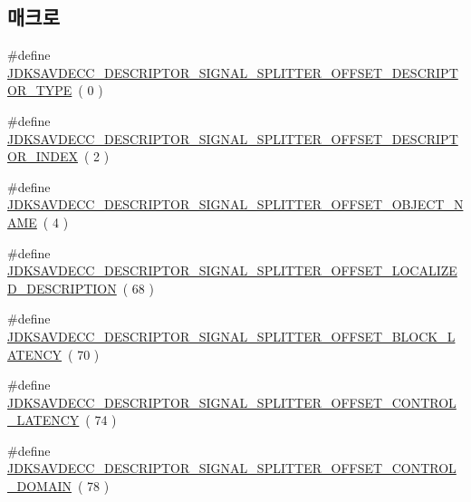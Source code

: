 \subsection*{매크로}
\begin{DoxyCompactItemize}
\item 
\#define \hyperlink{group__descriptor__signal__splitter_gaa30141f887824db3fb3f23ed7300f216}{J\+D\+K\+S\+A\+V\+D\+E\+C\+C\+\_\+\+D\+E\+S\+C\+R\+I\+P\+T\+O\+R\+\_\+\+S\+I\+G\+N\+A\+L\+\_\+\+S\+P\+L\+I\+T\+T\+E\+R\+\_\+\+O\+F\+F\+S\+E\+T\+\_\+\+D\+E\+S\+C\+R\+I\+P\+T\+O\+R\+\_\+\+T\+Y\+PE}~( 0 )
\item 
\#define \hyperlink{group__descriptor__signal__splitter_gad8d5f70506d10dc65303bf58be7d88cd}{J\+D\+K\+S\+A\+V\+D\+E\+C\+C\+\_\+\+D\+E\+S\+C\+R\+I\+P\+T\+O\+R\+\_\+\+S\+I\+G\+N\+A\+L\+\_\+\+S\+P\+L\+I\+T\+T\+E\+R\+\_\+\+O\+F\+F\+S\+E\+T\+\_\+\+D\+E\+S\+C\+R\+I\+P\+T\+O\+R\+\_\+\+I\+N\+D\+EX}~( 2 )
\item 
\#define \hyperlink{group__descriptor__signal__splitter_gadb2f6ff7be09a4581b4b04acd37073b0}{J\+D\+K\+S\+A\+V\+D\+E\+C\+C\+\_\+\+D\+E\+S\+C\+R\+I\+P\+T\+O\+R\+\_\+\+S\+I\+G\+N\+A\+L\+\_\+\+S\+P\+L\+I\+T\+T\+E\+R\+\_\+\+O\+F\+F\+S\+E\+T\+\_\+\+O\+B\+J\+E\+C\+T\+\_\+\+N\+A\+ME}~( 4 )
\item 
\#define \hyperlink{group__descriptor__signal__splitter_ga47a3f53288d09ff53d8a6df06fef4dc7}{J\+D\+K\+S\+A\+V\+D\+E\+C\+C\+\_\+\+D\+E\+S\+C\+R\+I\+P\+T\+O\+R\+\_\+\+S\+I\+G\+N\+A\+L\+\_\+\+S\+P\+L\+I\+T\+T\+E\+R\+\_\+\+O\+F\+F\+S\+E\+T\+\_\+\+L\+O\+C\+A\+L\+I\+Z\+E\+D\+\_\+\+D\+E\+S\+C\+R\+I\+P\+T\+I\+ON}~( 68 )
\item 
\#define \hyperlink{group__descriptor__signal__splitter_gaadf9bd9d071b93d62ef0003f9713b187}{J\+D\+K\+S\+A\+V\+D\+E\+C\+C\+\_\+\+D\+E\+S\+C\+R\+I\+P\+T\+O\+R\+\_\+\+S\+I\+G\+N\+A\+L\+\_\+\+S\+P\+L\+I\+T\+T\+E\+R\+\_\+\+O\+F\+F\+S\+E\+T\+\_\+\+B\+L\+O\+C\+K\+\_\+\+L\+A\+T\+E\+N\+CY}~( 70 )
\item 
\#define \hyperlink{group__descriptor__signal__splitter_ga2eda802bbe070f5c3faaca3dae0dc34f}{J\+D\+K\+S\+A\+V\+D\+E\+C\+C\+\_\+\+D\+E\+S\+C\+R\+I\+P\+T\+O\+R\+\_\+\+S\+I\+G\+N\+A\+L\+\_\+\+S\+P\+L\+I\+T\+T\+E\+R\+\_\+\+O\+F\+F\+S\+E\+T\+\_\+\+C\+O\+N\+T\+R\+O\+L\+\_\+\+L\+A\+T\+E\+N\+CY}~( 74 )
\item 
\#define \hyperlink{group__descriptor__signal__splitter_ga02aef2285d2c941c9d20e66e37c66287}{J\+D\+K\+S\+A\+V\+D\+E\+C\+C\+\_\+\+D\+E\+S\+C\+R\+I\+P\+T\+O\+R\+\_\+\+S\+I\+G\+N\+A\+L\+\_\+\+S\+P\+L\+I\+T\+T\+E\+R\+\_\+\+O\+F\+F\+S\+E\+T\+\_\+\+C\+O\+N\+T\+R\+O\+L\+\_\+\+D\+O\+M\+A\+IN}~( 78 )

\end{DoxyCompactItemize}

